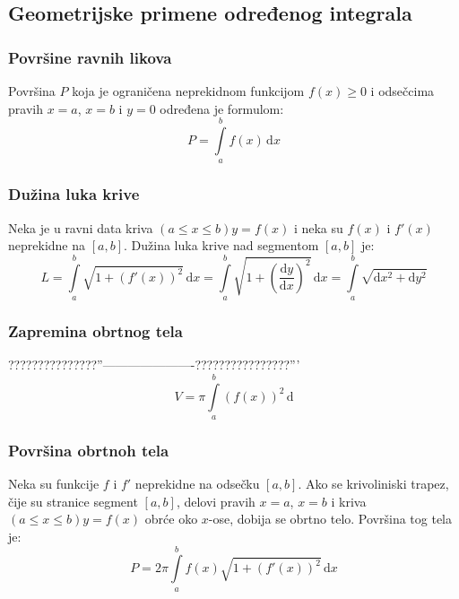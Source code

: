 \subsection{Geometrijske primene određenog integrala}


\subsubsection{Površine ravnih likova}
\begin{theorem}
	Površina $P$ koja je ograničena neprekidnom funkcijom $f(x)\geq 0$ i odsečcima pravih $x=a$, $x=b$ i $y=0$ određena je formulom:
	$$P  = \int \limits^b_a f(x) \, \mathrm{d}x$$
\end{theorem}

\subsubsection{Dužina luka krive}
\begin{theorem}
	Neka je u ravni data kriva $(a\leq x \leq b) y=f(x)$ i neka su $f(x)$ i $f'(x)$ neprekidne na $[a,b]$. Dužina luka krive nad segmentom $[a,b]$ je:
	$$L = \int \limits^b_a \sqrt{1+(f'(x))^2} \, \mathrm{d}x = \int \limits^b_a \sqrt{1+(\frac{\mathrm{d}y}{\mathrm{d}x})^2} \, \mathrm{d}x = \int \limits^b_a \sqrt{\mathrm{d}x^2 + \mathrm{d}y^2}$$
\end{theorem}

\subsubsection{Zapremina obrtnog tela}
\begin{theorem}
	???????????????''----------------------????????????????'''
	$$V= \pi \int \limits^b_a \left(f(x)\right)^2\, \mathrm{d}$$
\end{theorem}

\subsubsection{Površina obrtnoh tela}
\begin{theorem}
	Neka su funkcije $f$ i $f'$ neprekidne na odsečku $[a,b]$. Ako se krivoliniski trapez, čije su stranice segment $[a,b]$, delovi pravih $x=a$, $x=b$ i kriva $(a\leq x \leq b) y=f(x)$ obrće oko $x$-ose, dobija se obrtno telo. Površina tog tela je:
	$$P = 2\pi \int \limits^b_a f(x) \sqrt{1+(f'(x))^2}\, \mathrm{d}x$$
\end{theorem}


